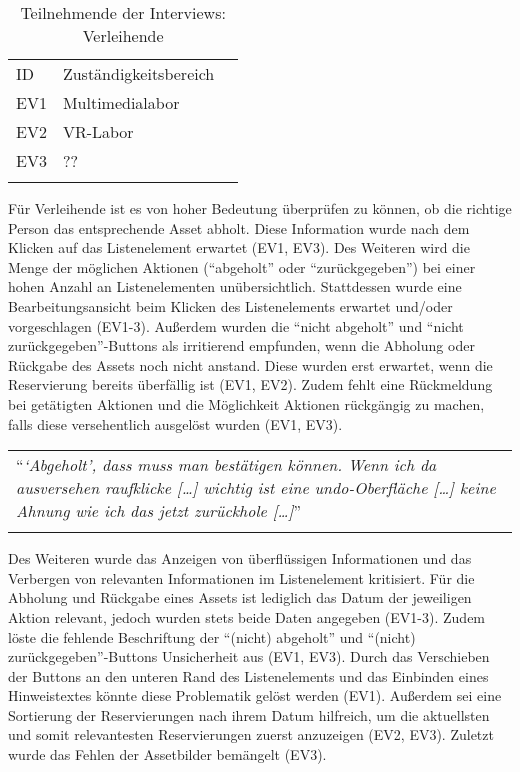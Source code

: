 \begin{table}[h]
  \centering
  \caption{Teilnehmende der Interviews: Verleihende}
  \begin{tabular}{lll}
    \arrayrulecolor{maincolor}\hline
    \sffamily\color{maincolor}ID &
    \sffamily\color{maincolor}Zuständigkeitsbereich \\
    \arrayrulecolor{maincolor}\hline
    EV1                         & Multimedialabor  \\
    EV2                         & VR-Labor         \\
    EV3                         & ??               \\
    \arrayrulecolor{maincolor}\hline
  \end{tabular}
  \label{table:vzwei}
\end{table}

Für Verleihende ist es von hoher Bedeutung überprüfen zu können, ob die richtige Person das
entsprechende Asset abholt. Diese Information wurde nach dem Klicken auf das Listenelement erwartet
(EV1, EV3). Des Weiteren wird die Menge der möglichen Aktionen (\enquote{abgeholt} oder
\enquote{zurückgegeben}) bei einer hohen Anzahl an Listenelementen unübersichtlich. Stattdessen
wurde eine Bearbeitungsansicht beim Klicken des Listenelements erwartet und/oder vorgeschlagen
(EV1-3). Außerdem wurden die \enquote{nicht abgeholt} und \enquote{nicht zurückgegeben}-Buttons als
irritierend empfunden, wenn die Abholung oder Rückgabe des Assets noch nicht anstand. Diese wurden
erst erwartet, wenn die Reservierung bereits überfällig ist (EV1, EV2). Zudem fehlt eine Rückmeldung
bei getätigten Aktionen und die Möglichkeit Aktionen rückgängig zu machen, falls diese versehentlich
ausgelöst wurden (EV1, EV3). 

\begin{longtable}{p{}} \arrayrulecolor{maincolor}\hline
  \enquote{\textit{\enquote{Abgeholt}, dass muss man bestätigen können. Wenn ich
  da ausversehen raufklicke [\dots] wichtig ist eine undo-Oberfläche [\dots]
  keine Ahnung wie ich das jetzt zurückhole [\dots]}} \\
  \arrayrulecolor{maincolor}\hline
\end{longtable}

Des Weiteren wurde das Anzeigen von überflüssigen Informationen und das Verbergen von relevanten
Informationen im Listenelement kritisiert. Für die Abholung und Rückgabe eines Assets ist lediglich
das Datum der jeweiligen Aktion relevant, jedoch wurden stets beide Daten angegeben (EV1-3). Zudem
löste die fehlende Beschriftung der \enquote{(nicht) abgeholt} und \enquote{(nicht)
zurückgegeben}-Buttons Unsicherheit aus (EV1, EV3). Durch das Verschieben der Buttons an den unteren
Rand des Listenelements und das Einbinden eines Hinweistextes könnte diese Problematik gelöst
werden (EV1). Außerdem sei eine Sortierung der Reservierungen nach ihrem Datum hilfreich, um die
aktuellsten und somit relevantesten Reservierungen zuerst anzuzeigen (EV2, EV3). Zuletzt wurde das Fehlen
der Assetbilder bemängelt (EV3). 

